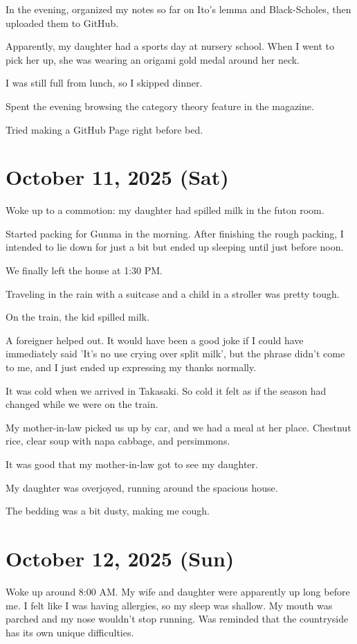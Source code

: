 \documentclass[uplatex]{jsarticle}
\begin{document}
In the evening, organized my notes so far on Ito's lemma and Black-Scholes, then uploaded them to GitHub.

Apparently, my daughter had a sports day at nursery school. When I went to pick her up, she was wearing an origami gold medal around her neck.

I was still full from lunch, so I skipped dinner.

Spent the evening browsing the category theory feature in the magazine.

Tried making a GitHub Page right before bed.

\section{October 11, 2025 (Sat)}

Woke up to a commotion: my daughter had spilled milk in the futon room.

Started packing for Gunma in the morning. After finishing the rough packing, I intended to lie down for just a bit but ended up sleeping until just before noon.

We finally left the house at 1:30 PM.

Traveling in the rain with a suitcase and a child in a stroller was pretty tough.

On the train, the kid spilled milk.

A foreigner helped out.
It would have been a good joke if I could have immediately said 'It's no use crying over split milk', but the phrase didn't come to me, and I just ended up expressing my thanks normally.

It was cold when we arrived in Takasaki.
So cold it felt as if the season had changed while we were on the train.

My mother-in-law picked us up by car, and we had a meal at her place.
Chestnut rice, clear soup with napa cabbage, and persimmons.

It was good that my mother-in-law got to see my daughter.

My daughter was overjoyed, running around the spacious house.

The bedding was a bit dusty, making me cough.

\section{October 12, 2025 (Sun)}

Woke up around 8:00 AM.
My wife and daughter were apparently up long before me.
I felt like I was having allergies, so my sleep was shallow.
My mouth was parched and my nose wouldn't stop running.
Was reminded that the countryside has its own unique difficulties.
\end{document}
